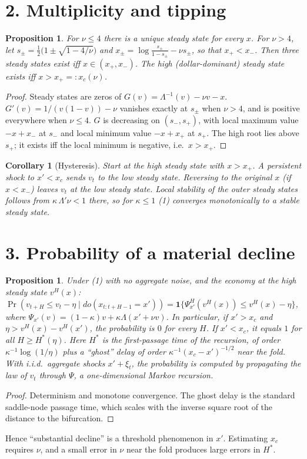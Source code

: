 \documentclass[11pt]{article}
\newtheorem{proposition}[theorem]{Proposition}
\newtheorem{corollary}[theorem]{Corollary}
\theoremstyle{definition}
\begin{document}
\section*{2. Multiplicity and tipping}
\begin{proposition}\label{prop:mult}
For $\nu\le4$ there is a unique steady state for every $x$. For $\nu>4$, let
$s_\pm=\tfrac12\bigl(1\pm\sqrt{1-4/\nu}\bigr)$ and $x_\pm=\log\frac{s_\pm}{1-s_\pm}-\nu s_\pm$, so that $x_+<x_-$. Then three
steady states exist iff $x\in(x_+,x_-)$. The high (dollar-dominant) steady state exists iff $x>x_+=:x_c(\nu)$.
\end{proposition}
\begin{proof}
Steady states are zeros of $G(v)=\Lambda^{-1}(v)-\nu v-x$. $G'(v)=1/(v(1-v))-\nu$ vanishes exactly at $s_\pm$ when
$\nu>4$, and is positive everywhere when $\nu\le4$. $G$ is decreasing on $(s_-,s_+)$, with local maximum value $-x+x_-$ at
$s_-$ and local minimum value $-x+x_+$ at $s_+$. The high root lies above $s_+$; it exists iff the local minimum is
negative, i.e.\ $x>x_+$.
\end{proof}
\begin{corollary}[Hysteresis]
Start at the high steady state with $x>x_+$. A persistent shock to $x'<x_c$ sends $v_t$ to the low steady state. Reversing
to the original $x$ (if $x<x_-$) leaves $v_t$ at the low steady state. Local stability of the outer steady states follows
from $\kappa\,\Lambda'\nu<1$ there, so for $\kappa\le1$ (1) converges monotonically to a stable steady state.
\end{corollary}

\section*{3. Probability of a material decline}
\begin{proposition}\label{prop:prob}
Under (1) with no aggregate noise, and the economy at the high steady state $v^H(x)$:
$\Pr(v_{t+H}\le v_t-\eta\mid do(x_{t:t+H-1}=x'))=\mathbf 1\{\Psi^{H}_{x'}(v^H(x))\le v^H(x)-\eta\}$, where
$\Psi_{x'}(v)=(1-\kappa)v+\kappa\Lambda(x'+\nu v)$. In particular, if $x'>x_c$ and $\eta>v^H(x)-v^H(x')$, the probability is $0$
for every $H$. If $x'<x_c$, it equals $1$ for all $H\ge H^*(\eta)$. Here $H^*$ is the first-passage time of the recursion,
of order $\kappa^{-1}\log(1/\eta)$ plus a ``ghost'' delay of order $\kappa^{-1}(x_c-x')^{-1/2}$ near the fold.
With i.i.d.\ aggregate shocks $x'+\xi_t$, the probability is computed by propagating the law of $v_t$ through
$\Psi$, a one-dimensional Markov recursion.
\end{proposition}
\begin{proof}
Determinism and monotone convergence. The ghost delay is the standard saddle-node passage time, which scales with the
inverse square root of the distance to the bifurcation.
\end{proof}
Hence ``substantial decline'' is a threshold phenomenon in $x'$. Estimating $x_c$ requires $\nu$, and a small error in $\nu$
near the fold produces large errors in $H^*$.
\end{document}
